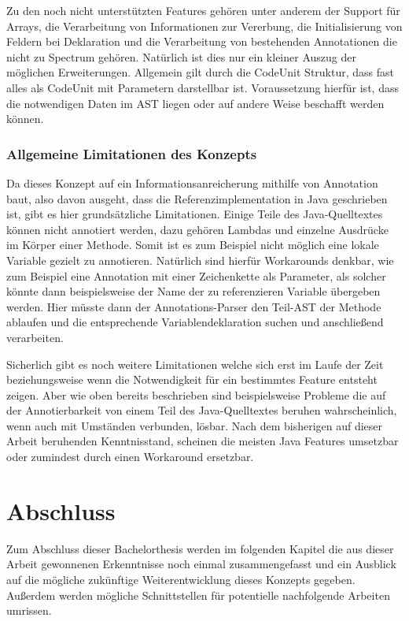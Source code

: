 \documentclass[12pt,oneside,a4paper,parskip]{scrbook}
\begin{document}
Zu den noch nicht unterstützten Features gehören unter anderem der Support für Arrays, die Verarbeitung von Informationen zur Vererbung, die Initialisierung von Feldern bei Deklaration und die Verarbeitung von bestehenden Annotationen die nicht zu Spectrum gehören. Natürlich ist dies nur ein kleiner Auszug der möglichen Erweiterungen. Allgemein gilt durch die CodeUnit Struktur, dass fast alles als CodeUnit mit Parametern darstellbar ist. Voraussetzung hierfür ist, dass die notwendigen Daten im AST liegen oder auf andere Weise beschafft werden können.

\subsection{Allgemeine Limitationen des Konzepts}

Da dieses Konzept auf ein Informationsanreicherung mithilfe von Annotation baut, also davon ausgeht, dass die Referenzimplementation in Java geschrieben ist, gibt es hier grundsätzliche Limitationen. Einige Teile des Java-Quelltextes können nicht annotiert werden, dazu gehören Lambdas und einzelne Ausdrücke im Körper einer Methode. Somit ist es zum Beispiel nicht möglich eine lokale Variable gezielt zu annotieren. Natürlich sind hierfür Workarounds denkbar, wie zum Beispiel eine Annotation mit einer Zeichenkette als Parameter, als solcher könnte dann beispielsweise der Name der zu referenzieren Variable übergeben werden. Hier müsste dann der Annotations-Parser den Teil-AST der Methode ablaufen und die entsprechende Variablendeklaration suchen und anschließend verarbeiten.

Sicherlich gibt es noch weitere Limitationen welche sich erst im Laufe der Zeit beziehungsweise wenn die Notwendigkeit für ein bestimmtes Feature entsteht zeigen. Aber wie oben bereits beschrieben sind beispielsweise Probleme die auf der Annotierbarkeit von einem Teil des Java-Quelltextes beruhen wahrscheinlich, wenn auch mit Umständen verbunden, lösbar. Nach dem bisherigen auf dieser Arbeit beruhenden Kenntnisstand, scheinen die meisten Java Features umsetzbar oder zumindest durch einen Workaround ersetzbar.

\chapter{Abschluss}

Zum Abschluss dieser Bachelorthesis werden im folgenden Kapitel die aus dieser Arbeit gewonnenen Erkenntnisse noch einmal zusammengefasst und ein Ausblick auf die mögliche zukünftige Weiterentwicklung dieses Konzepts gegeben. Außerdem werden mögliche Schnittstellen für potentielle nachfolgende Arbeiten umrissen.
\end{document}
